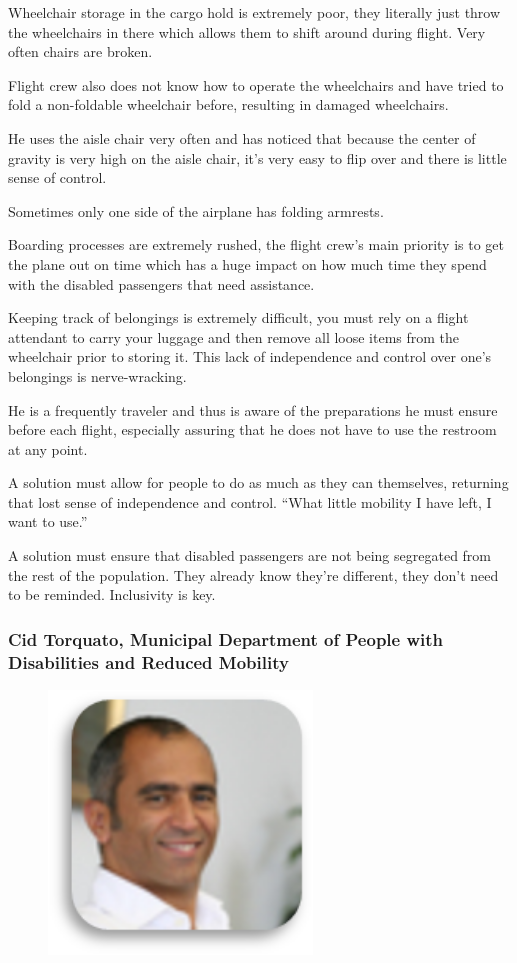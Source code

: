 \documentclass[a4paper, 12pt,conference]{new_cit_thesis}
\begin{document}
\begin{list}{-}{}
  \item Wheelchair storage in the cargo hold is extremely poor, they literally just throw the wheelchairs in there which allows them to shift around during flight. Very often chairs are broken. 
  \item Flight crew also does not know how to operate the wheelchairs and have tried to fold a non-foldable wheelchair before, resulting in damaged wheelchairs.
  \item He uses the aisle chair very often and has noticed that because the center of gravity is very high on the aisle chair, it’s very easy to flip over and there is little sense of control.
  \item Sometimes only one side of the airplane has folding armrests. 
  \item Boarding processes are extremely rushed, the flight crew’s main priority is to get the plane out on time which has a huge impact on how much time they spend with the disabled passengers that need assistance. 
  \item Keeping track of belongings is extremely difficult, you must rely on a flight attendant to carry your luggage and then remove all loose items from the wheelchair prior to storing it. This lack of independence and control over one’s belongings is nerve-wracking.
  \item He is a frequently traveler and thus is aware of the preparations he must ensure before each flight, especially assuring that he does not have to use the restroom at any point. 
  \item A solution must allow for people to do as much as they can themselves, returning that lost sense of independence and control. “What little mobility I have left, I want to use.”
  \item A solution must ensure that disabled passengers are not being segregated from the rest of the population. They already know they’re different, they don’t need to be reminded. Inclusivity is key. 
\end{list}

\subsubsection{Cid Torquato, Municipal Department of People with Disabilities and Reduced Mobility}
\begin{figure}[h]
  \centering
     \includegraphics[width=7cm]{images/image026}
  \label{fig:26}
\end{figure}
\end{document}
